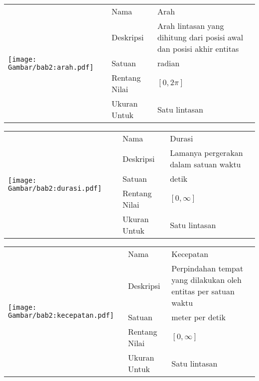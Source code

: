 \documentclass[a4paper,twoside]{article}
\begin{document}
\begin{table}[h!]
    \centering
    \begin{tabular}{|m{4cm}|l|p{8cm}|} 
        \hline
        \multirow{5}{*}{
            \texttt{[image: Gambar/bab2:arah.pdf]}
        } & Nama & Arah \\ 
        \cline{2-3}
        & Deskripsi & Arah lintasan yang dihitung dari posisi awal dan posisi akhir entitas                    \\ 
        \cline{2-3}
        & Satuan & radian                    \\ 
        \cline{2-3}
        & Rentang Nilai & $[0, 2\pi]$                    \\ 
        \cline{2-3}
        & Ukuran Untuk & Satu lintasan                    \\
        \hline
    \end{tabular}
\end{table}

\begin{table}[h!]
    \centering
    \begin{tabular}{|m{4cm}|l|p{8cm}|} 
        \hline
        \multirow{5}{*}{
            \texttt{[image: Gambar/bab2:durasi.pdf]}
        } & Nama & Durasi \\ 
        \cline{2-3}
        & Deskripsi & Lamanya pergerakan dalam satuan waktu                    \\ 
        \cline{2-3}
        & Satuan & detik                    \\ 
        \cline{2-3}
        & Rentang Nilai & $[0, \infty]$                    \\ 
        \cline{2-3}
        & Ukuran Untuk & Satu lintasan                    \\
        \hline
    \end{tabular}
\end{table}

\begin{table}[h!]
    \centering
    \begin{tabular}{|m{4cm}|l|p{8cm}|} 
        \hline
        \multirow{5}{*}{
            \texttt{[image: Gambar/bab2:kecepatan.pdf]}
        } & Nama & Kecepatan \\ 
        \cline{2-3}
        & Deskripsi & Perpindahan tempat yang dilakukan oleh entitas per satuan waktu                    \\ 
        \cline{2-3}
        & Satuan & meter per detik                   \\ 
        \cline{2-3}
        & Rentang Nilai & $[0, \infty]$                    \\ 
        \cline{2-3}
        & Ukuran Untuk & Satu lintasan                    \\
        \hline
    \end{tabular}
\end{table}
\end{document}
